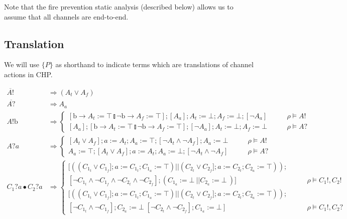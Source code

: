 \documentclass[times, 10pt]{article}
\begin{document}
Note that the fire prevention static analysis (described below) allows us to assume that all
channels are end-to-end.

\subsection{Translation}

We will use $\{P\}$ as shorthand to indicate terms which are translations of
channel actions in CHP.

\begin{align*}
    \overline{A!} & \Rightarrow (A_t \vee A_f) \\
    \overline{A?} & \Rightarrow A_a \\
    A!\mathrm{b} & \Rightarrow \left\{ \begin{matrix} [\mathrm{b} \rightarrow A_t := \top \talloblong \neg \mathrm{b} \rightarrow A_f := \top]; [A_a]; A_t := \bot; A_f := \bot; [\neg A_a] & \qquad \rho \vDash A! \\
                                                      [A_a]; [\mathrm{b} \rightarrow A_t := \top \talloblong \neg \mathrm{b} \rightarrow A_f := \top]; [\neg A_a]; A_t := \bot; A_f := \bot & \qquad \rho \vDash A? \end{matrix} \right. \\
    A?a & \Rightarrow \left\{ \begin{matrix} [A_t \vee A_f]; a := A_t; A_a := \top; [\neg A_t \wedge \neg A_f]; A_a := \bot & \qquad \rho \vDash A! \\
                                             A_a := \top; [A_t \vee A_f]; a := A_t; A_a := \bot; [\neg A_t \wedge \neg A_f] & \qquad \rho \vDash A? \end{matrix} \right. \\
    C_1?a \bullet C_2?a & \Rightarrow \left\{ \begin{matrix} [ ((C_{1_t} \vee C_{1_f}]; a := C_{1_t}; C_{1_a} := \top) || (C_{2_t} \vee C_{2_f}]; a := C_{2_t}; C_{2_a} := \top)); 
    \\ [\neg C_{1_t} \wedge \neg C_{1_f} \wedge \neg C_{2_t} \wedge \neg C_{2_f}]; (C_{1_a} := \bot\ ||C_{2_a} := \bot\ ) ]& \qquad \rho \vDash C_1!, C_2! \\
     [ ((C_{1_t} \vee C_{1_f}]; a := C_{1_t}; C_{1_a} := \top) || (C_{2_t} \vee C_{2_f}]; a := C_{2_t}; C_{2_a} := \top)); 
    \\ [\neg C_{1_t} \wedge \neg C_{1_f}];  C_{2_a} := \bot\; [ \neg C_{2_t} \wedge \neg C_{2_f}]; C_{1_a} := \bot\ ]& \qquad \rho \vDash C_1!, C_2?

\end{matrix}
\end{align*}
\end{document}
